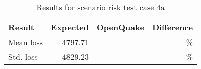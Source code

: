 \begin{table}[htbp]

\centering
\begin{tabular}{ l r r r }

\hline
\rowcolor{anti-flashwhite}
\bf{Result} & \bf{Expected} & \bf{OpenQuake} & \bf{Difference}\\
\hline
Mean loss & 4797.71 &  & \% \\
Std. loss & 4829.23 &  & \% \\
\hline
\end{tabular}

\caption{Results for scenario risk test case 4a}
\label{tab:result-scenario-risk-4a}
\end{table}